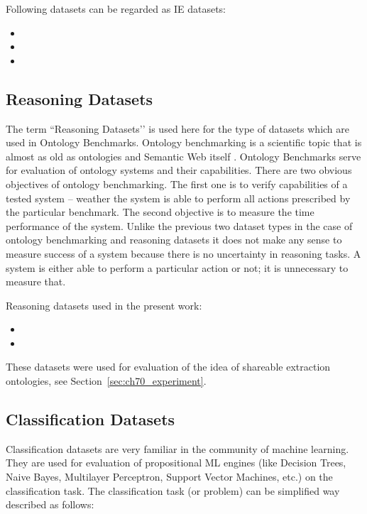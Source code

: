 Following datasets can be regarded as IE datasets:

\begin{itemize}
	\item {}
	\item {}
	\item {}
\end{itemize}




\subsection{Reasoning Datasets}


The term ``Reasoning Datasets’’ is used here for the type of datasets which are used in Ontology Benchmarks. Ontology benchmarking is a scientific topic that is almost as old as ontologies and Semantic Web itself \citep{DBLP:conf/semweb/GuoHP03}. Ontology Benchmarks serve for evaluation of ontology systems and their capabilities. There are two obvious objectives of ontology benchmarking. The first one is to verify capabilities of a tested system -- weather the system is able to perform all actions prescribed by the particular benchmark. The second objective is to measure the time performance of the system. Unlike the previous two dataset types in the case of ontology benchmarking and reasoning datasets it does not make any sense to measure success of a system because there is no uncertainty in reasoning tasks. A system is either able to perform a particular action or not; it is unnecessary to measure that. 

Reasoning datasets used in the present work:
\begin{itemize}
	\item {}
	\item {}
\end{itemize}

These datasets were used for evaluation of the idea of shareable extraction ontologies, see Section~\ref{sec:ch70_experiment}. 


\subsection{Classification Datasets}
Classification datasets are very familiar in the community of machine learning. They are used for evaluation of propositional ML engines (like Decision Trees, Naive Bayes, Multilayer Perceptron, Support Vector Machines, etc.) on the classification task. The classification task (or problem) can be simplified way described as follows: 

